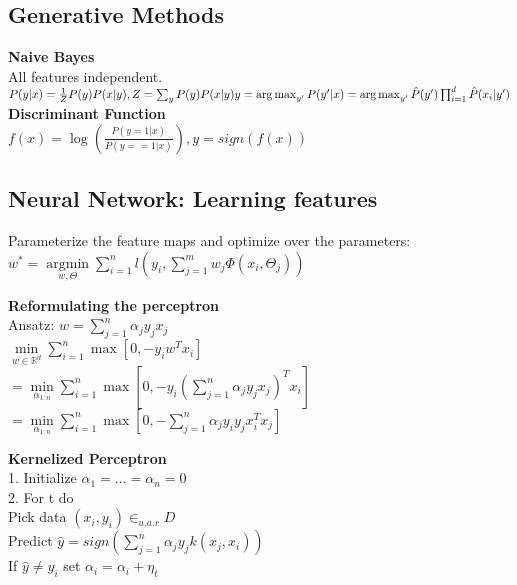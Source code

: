 \subsection*{Generative Methods}

\textbf{Naive Bayes} \\
All features independent.\\
$
P(y|x) = \frac{1}{Z} P(y) P(x|y), Z = \sum_{y} P(y) P(x|y) \\
y = \operatorname*{arg\,max}_{y'} P(y'|x) = \operatorname*{arg\,max}_{y'} \hat{P}(y') \prod_{i=1}^{d} \hat{P}(x_i|y')
$ \\
\textbf{Discriminant Function}\\
$
f(x) = \log(\frac{P(y=1|x)}{P(y==1|x)}), y=sign(f(x))
$

\subsection*{Neural Network: Learning features}
Parameterize the feature maps and optimize over the parameters:\\
$w^* = \underset{w, \Theta}{\operatorname{argmin}} \sum_{i=1}^n l(y_i, \sum_{j=1}^m w_j \Phi(x_i, \Theta_j))$

\textbf{Reformulating the perceptron} \\
Ansatz: $w=\sum_{j=1}^n \alpha_j y_j x_j$\\
$\min \limits_{w\in\mathbb{R}^d} \sum_{i=1}^n \max [0, -y_i w^T x_i]$\\
$= \min \limits_{\alpha_{1:n}} \sum_{i=1}^n \max [0,-y_i  ( \sum_{j=1}^n \alpha_j y_j x_j  )^T x_i ]$\\
$= \min \limits_{\alpha_{1:n}} \sum_{i=1}^n \max  [0,- \sum_{j=1}^n \alpha_j y_i y_j x_i^T x_j ]$
        
\textbf{Kernelized Perceptron} \\
1. Initialize $\alpha_1 = ... = \alpha_n = 0$\\
2. For t do \\
Pick data $(x_i,y_i) \in_{u.a.r} D$\\
Predict $\hat{y} = sign(\sum_{j=1}^n \alpha_j y_j k(x_j,x_i))$\\
If $\hat{y} \not = y_i$ set $\alpha_i = \alpha_i + \eta_t$